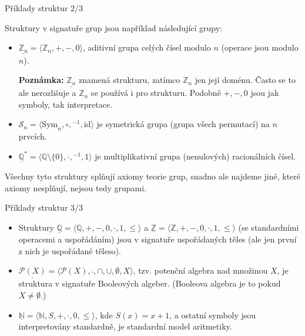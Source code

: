 \documentclass{beamer}
\begin{document}
\begin{frame}{Příklady struktur 2/3}
    
    Struktury \alert{v signatuře grup} jsou například následující \alert{grupy}:
        \begin{itemize}
            \item $\underline{\mathbb Z_n}=\langle\mathbb Z_n,+,-,0\rangle$, \alert{aditivní grupa celých čísel modulo $n$} (operace jsou modulo $n$). 
            
            \smallskip
            
            \textbf{Poznámka:} $\underline{\mathbb Z_n}$ znamená strukturu, zatímco $\mathbb Z_n$ jen její doménu. Často se to ale nerozlišuje a $\mathbb Z_n$ se používá i pro strukturu. Podobně $+,-,0$ jsou jak symboly, tak interpretace.

            \smallskip

            \item $\mathcal S_n=\langle \mathrm{Sym}_n,\circ,{}^{-1},\mathrm{id}\rangle$ je \alert{symetrická grupa} (grupa všech permutací) na $n$ prvcích.
            \item $\underline{\mathbb Q}^*=\langle \mathbb Q\setminus\{0\},\cdot,{}^{-1},1\rangle$ je \alert{multiplikativní grupa (nenulových) racionálních čísel}. 
        \end{itemize}
        Všechny tyto struktury \alert{splňují axiomy teorie grup}, snadno ale najdeme jiné, které axiomy nesplňují, nejsou tedy grupami.
    

\end{frame}


\begin{frame}{Příklady struktur 3/3}
    
    \begin{itemize}
        \item Struktury $\underline{\mathbb Q}=\langle \mathbb Q, +, -, 0,\cdot,1,\leq\rangle$ a $\underline{\mathbb Z}=\langle \mathbb Z, +, -, 0,\cdot,1,\leq\rangle$ (se standardními operacemi a uspořádáním) jsou \alert{v signatuře uspořádaných těles} (ale jen první z nich je uspořádané těleso).
        \item $\underline{\mathcal P(X)}=\langle \mathcal P(X),\bar{},\cap,\cup,\emptyset,X\rangle$, tzv. \alert{potenční algebra} nad množinou $X$, je struktura \alert{v signatuře Booleových algeber}. (\alert{Booleova algebra} je to pokud $X\neq\emptyset$.)
        \item $\underline{\mathbb N}=\langle \mathbb N,S,+,\cdot,0,\leq\rangle$, kde $S(x)=x+1$, a ostatní symboly jsou interpretovány standardně, je \alert{standardní model aritmetiky}.
    \end{itemize}

\end{frame}
\end{document}
